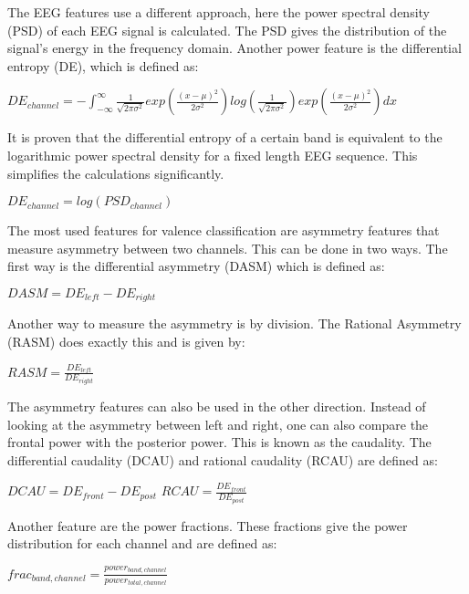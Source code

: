 The EEG features use a different approach, here the power spectral density (PSD) of each EEG signal is calculated. The PSD gives the distribution of the signal's energy in the frequency domain. Another power feature is the differential entropy (DE), which is defined as:
\begin{center}
$DE_{channel} = - \int_{-\infty}^{\infty} \frac{1}{\sqrt{2\pi\sigma^2}} exp(\frac{(x-\mu)^2}{2\sigma^2}) log(\frac{1}{\sqrt{2\pi\sigma^2}}) exp(\frac{(x-\mu)^2}{2\sigma^2})dx$
\end{center}
It is proven that the differential entropy of a certain band is equivalent to the logarithmic power spectral density for a fixed length EEG sequence\citep{diffEnt}. This simplifies the calculations significantly.
\begin{center}
$DE_{channel} = log(PSD_{channel})$
\end{center}

\npar

The most used features for valence classification are asymmetry features that measure asymmetry between two channels. This can be done in two ways. The first way is the differential asymmetry (DASM) which is defined as:

\begin{center}
$DASM = DE_{left} - DE_{right}$
\end{center}

Another way to measure the asymmetry is by division. The Rational Asymmetry (RASM)  does exactly this and is given by: \\

\begin{center}
$RASM = \frac{DE_{left}}{DE_{right}}$
\end{center}

\npar

The asymmetry features can also be used in the other direction. Instead of looking at the asymmetry between left and right, one can also compare the frontal power with the posterior power. This is known as the caudality. The differential caudality (DCAU) and rational caudality (RCAU) are defined as:
\begin{center}
$DCAU = DE_{front} - DE_{post}$
$RCAU = \frac{DE_{front}}{DE_{post}}$
\end{center}

\npar

Another feature are the power fractions. These fractions give the power distribution for each channel and are defined as:
\begin{center}
$frac_{band,channel} = \frac{power_{band,channel}}{power_{total,channel}}$
\end{center}

